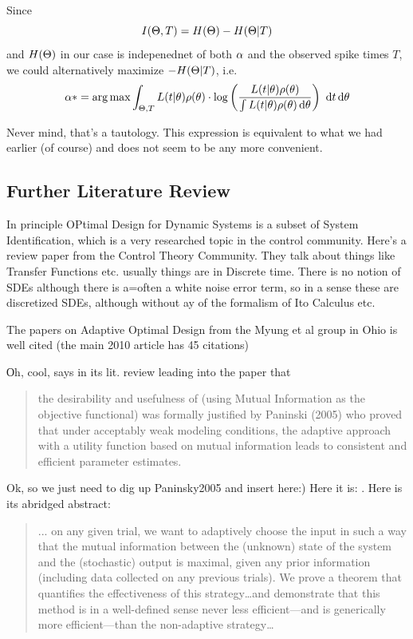 \documentclass{article}
\begin{document}
Since 
$$I({\Theta}, T) = H({\Theta}) - H({\Theta}|T)$$ and $H({\Theta})$ in our case is indepenednet of
both ${\alpha}$ and the observed spike times $T$, we could alternatively maximize
$-H({\Theta}|T)$, i.e.
$$
\a* = \argmax \int_{\Th, T}  L(t|\th) \rho(\th) \cdot
 \log \left( \frac{L(t|\th) \rho(\th)}{ \int L(t|\th) \rho(\th) \intd{\th}}\right) 
 \, \intd{t} \intd{\th}$$

Never mind, that's a tautology. This expression is equivalent to what we had
earlier (of course) and does not seem to be any more
convenient.

\subsection{Further Literature Review}	
In principle OPtimal Design for Dynamic Systems is a subset of System
Identification, which is a very researched topic in the control community.
Here's a review paper \cite{Gevers2011} from the Control Theory Community. 
They talk about things like Transfer Functions etc. usually things are in
Discrete time. There is no notion of SDEs although there is a=often a white
noise error term, so in a sense these are discretized SDEs, although without ay
of the formalism of Ito Calculus etc. 

The papers on Adaptive Optimal Design from the Myung et al group in Ohio is well
cited (the main 2010 \cite{Cavagnaro2010} article has 45 citations) 

Оh, cool,  \cite{Cavagnaro2010} says in its lit. review leading into the paper
that 
\begin{quote}
the desirability and usefulness of (using Mutual Information as the objective
functional) was formally justified by Paninski (2005) who proved that under
acceptably weak modeling conditions, the adaptive approach with a utility function
based on mutual information leads to consistent and efficient parameter
estimates. 
\end{quote}

Ok, so we just need to dig up Paninsky2005 and insert here:) Here it is:
\cite{Paninski2005}. Here is its abridged abstract:
\begin{quote}
... on any given trial,
we want to adaptively choose the input in such a way that the mutual information
between the (unknown) state of the system and the (stochastic)
output is maximal, given any prior information (including data collected
on any previous trials). We prove a theorem that quantifies the effectiveness
of this strategy\ldots and demonstrate that
this method is in a well-defined sense never less efficient—and is generically
more efficient—than the non-adaptive strategy\ldots  
\end{quote}
\end{document}
